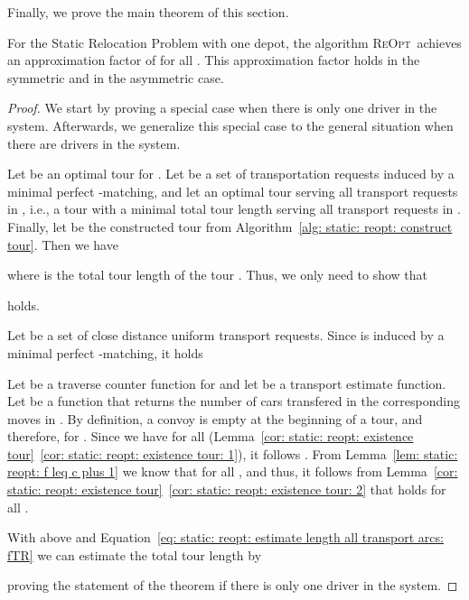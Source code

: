 \documentclass[english]{llncs}
\numberwithin{sublemma}{lemma}
\newcommand{\REOPT}{\textsc{ReOpt}\xspace}
\begin{document}
Finally, we prove the main theorem of this section.


\begin{theorem} \label{thm: static: reopt: approximation factor: symmetric and asymmetric}
For the Static Relocation Problem  with one depot,
the algorithm \REOPT\
achieves an approximation factor of  for all .
This approximation factor holds in the symmetric and in the asymmetric case.
\end{theorem}




\begin{proof}
We start by proving a special case when there is only one driver in the system.
Afterwards, we generalize this special case to the general situation when there are  drivers in the system.

Let  be an optimal tour for .
Let  be a set of transportation requests induced by a minimal perfect -matching, and let  an optimal tour serving all transport requests in ,
i.e., a tour with a minimal total tour length serving all transport requests in .
Finally, let  be the constructed tour from Algorithm~\ref{alg: static: reopt: construct tour}.
Then we have

where  is the total tour length of the tour .
Thus, we only need to show that

holds.

Let  be a set of close distance uniform transport requests.
Since  is induced by a minimal perfect -matching, it holds


Let  be a traverse counter function for  and let  be a transport estimate function.
Let  be a function that returns the number of cars transfered in the corresponding moves in .
By definition, a convoy is empty at the beginning of a tour, and therefore,  for .
Since we have  for all  (Lemma~\ref{cor: static: reopt: existence tour}~\ref{cor: static: reopt: existence tour: 1}),
it follows .
From Lemma~\ref{lem: static: reopt: f leq c plus 1} we know that  for all ,
and thus, it follows from Lemma~\ref{cor: static: reopt: existence tour}~\ref{cor: static: reopt: existence tour: 2} that  holds for all .

With above and Equation~\eqref{eq: static: reopt: estimate length all transport arcs: fTR} we can estimate the total tour length  by

proving the statement of the theorem if there is only one driver in the system.




\end{proof}
\end{document}
